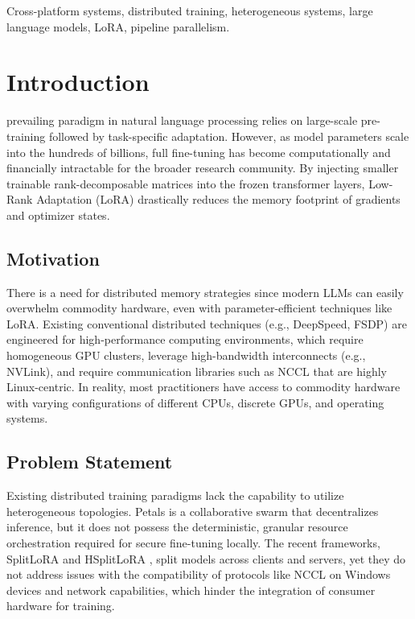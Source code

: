 \documentclass{ieeeaccess}
\begin{document}
\begin{keywords}
Cross-platform systems, distributed training, heterogeneous systems, large language models, LoRA, pipeline parallelism.
\end{keywords}

\titlepgskip=-15pt
\maketitle

\section{Introduction}
\label{sec:introduction}
 prevailing paradigm in natural language processing relies on large-scale pre-training followed by task-specific adaptation. However, as model parameters scale into the hundreds of billions, full fine-tuning has become computationally and financially intractable for the broader research community. By injecting smaller trainable rank-decomposable matrices into the frozen transformer layers, Low-Rank Adaptation (LoRA) \cite{hu2021lora} drastically reduces the memory footprint of gradients and optimizer states.

\subsection{Motivation}
There is a need for distributed memory strategies since modern LLMs can easily overwhelm commodity hardware, even with parameter-efficient techniques like LoRA. Existing conventional distributed techniques (e.g., DeepSpeed, FSDP) are engineered for high-performance computing environments, which require homogeneous GPU clusters, leverage high-bandwidth interconnects (e.g., NVLink), and require communication libraries such as NCCL that are highly Linux-centric. In reality, most practitioners have access to commodity hardware with varying configurations of different CPUs, discrete GPUs, and operating systems.

\subsection{Problem Statement}
Existing distributed training paradigms lack the capability to utilize heterogeneous topologies. Petals \cite{borzunov2023petals} is a collaborative swarm that decentralizes inference, but it does not possess the deterministic, granular resource orchestration required for secure fine-tuning locally. The recent frameworks, SplitLoRA \cite{lin2024splitlora} and HSplitLoRA \cite{lin2025hsplitlora}, split models across clients and servers, yet they do not address issues with the compatibility of protocols like NCCL on Windows devices and network capabilities, which hinder the integration of consumer hardware for training.
\end{document}
